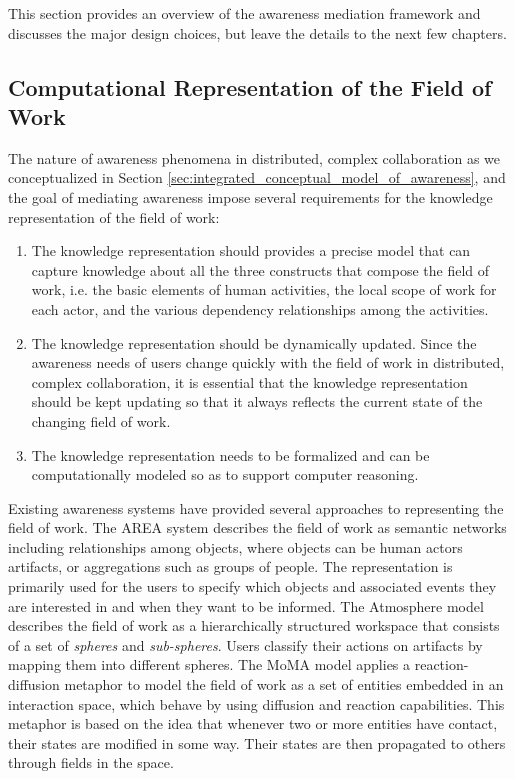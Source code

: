 This section provides an overview of the awareness mediation framework and discusses the major design choices, but leave the details to the next few chapters.

\subsection{Computational Representation of the Field of Work} %
\label{sub:computational_representation_of_the_field_of_work}
The nature of awareness phenomena in distributed, complex collaboration as we conceptualized in Section \ref{sec:integrated_conceptual_model_of_awareness}, and the goal of mediating awareness impose several requirements for the knowledge representation of the field of work:

\begin{enumerate}
   \item The knowledge representation should provides a precise model that can capture knowledge about all the three constructs that compose the field of work, i.e. the basic elements of human activities, the local scope of work for each actor, and the various dependency relationships among the activities. 
   \item The knowledge representation should be dynamically updated. Since the awareness needs of users change quickly with the field of work in distributed, complex collaboration, it is essential that the knowledge representation should be kept updating so that it always reflects the current state of the changing field of work.
   \item The knowledge representation needs to be formalized and can be computationally modeled so as to support computer reasoning.
\end{enumerate}

Existing awareness systems have provided several approaches to representing the field of work. The AREA system \cite{fuchs1999a} describes the field of work as semantic networks including relationships among objects, where objects can be human actors artifacts, or aggregations such as groups of people. The representation is primarily used for the users to specify which objects and associated events they are interested in and when they want to be informed. The Atmosphere model \cite{Rittenbruch2002} describes the field of work as a hierarchically structured workspace that consists of a set of \emph{spheres} and \emph{sub-spheres}. Users classify their actions on artifacts by mapping them into different spheres. The MoMA model \cite{simone2002a} applies a reaction-diffusion metaphor to model the field of work as a set of entities embedded in an interaction space, which behave by using diffusion and reaction capabilities. This metaphor is based on the idea that whenever two or more entities have contact, their states are modified in some way. Their states are then propagated to others through fields in the space.  

